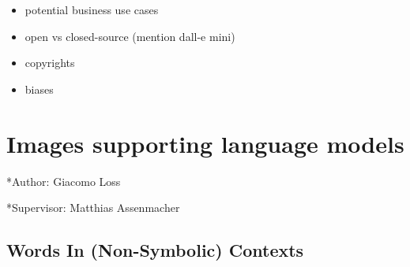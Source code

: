 \documentclass[
]{krantz}
\providecommand{\tightlist}{%
  \setlength{\itemsep}{0pt}\setlength{\parskip}{0pt}}
\begin{document}
\begin{itemize}
\tightlist
\item
  potential business use cases
\item
  open vs closed-source (mention dall-e mini)
\item
  copyrights
\item
  biases
\end{itemize}

\hypertarget{images-supporting-language-models}{%
\section{Images supporting language models}\label{images-supporting-language-models}}

*Author: Giacomo Loss

*Supervisor: Matthias Assenmacher

\hypertarget{words-in-non-symbolic-contexts}{%
\subsection{Words In (Non-Symbolic) Contexts}\label{words-in-non-symbolic-contexts}}
\end{document}
